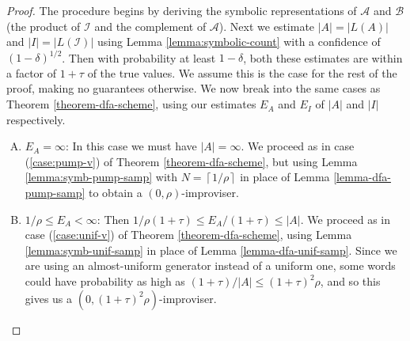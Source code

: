 \documentclass[a4paper,USenglish,numberwithinsect]{lipics}
\theoremstyle{plain}
\theoremstyle{definition}
\newcommand{\ceil}[1]{\left\lceil #1\right\rceil}
\newcommand{\improvs}{I}
\newcommand{\valids}{A}
\begin{document}
\theoremSymbolicScheme*
\begin{proof}
The procedure begins by deriving the symbolic representations of $\mathcal{\valids}$ and $\mathcal{B}$ (the product of $\mathcal{\improvs}$ and the complement of $\mathcal{\valids}$). Next we estimate $|\valids| = |L(\valids)|$ and $|\improvs| = |L(\mathcal{\improvs})|$ using Lemma \ref{lemma:symbolic-count} with a confidence of $(1-\delta)^{1/2}$. Then with probability at least $1 - \delta$, both these estimates are within a factor of $1+\tau$ of the true values. We assume this is the case for the rest of the proof, making no guarantees otherwise. We now break into the same cases as Theorem \ref{theorem-dfa-scheme}, using our estimates $E_{\valids}$ and $E_{\improvs}$ of $|\valids|$ and $|\improvs|$ respectively.

\begin{enumerate}[(A)]
\item $E_{\valids} = \infty$: In this case we must have $|\valids| = \infty$. We proceed as in case (\ref{case:pump-v}) of Theorem \ref{theorem-dfa-scheme}, but using Lemma \ref{lemma:symb-pump-samp} with $N = \ceil{1/\rho}$ in place of Lemma \ref{lemma-dfa-pump-samp} to obtain a $(0, \rho)$-improviser.

\item $1/\rho \le E_{\valids} < \infty$: Then $1/ \rho(1+\tau) \le E_{\valids} / (1+\tau) \le |\valids|$. We proceed as in case (\ref{case:unif-v}) of Theorem \ref{theorem-dfa-scheme}, using Lemma \ref{lemma:symb-unif-samp} in place of Lemma \ref{lemma-dfa-unif-samp}. Since we are using an almost-uniform generator instead of a uniform one, some words could have probability as high as $(1+\tau) / |\valids| \le (1+\tau)^2 \rho$, and so this gives us a $(0, (1+\tau)^2 \rho)$-improviser.


\end{enumerate}
\end{proof}
\end{document}
